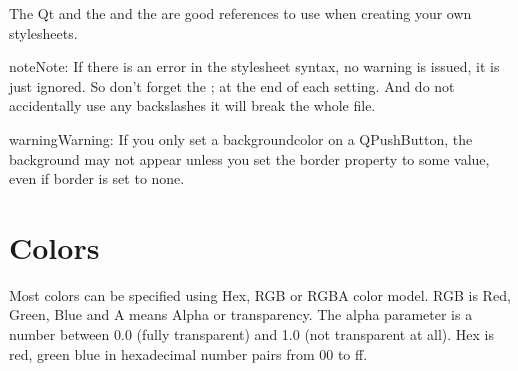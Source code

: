 \documentclass[letterpaper,10pt,english]{sphinxmanual}
\begin{document}
\sphinxAtStartPar
The Qt 
and the 
and the 
are good references to use when creating your own stylesheets.

\begin{sphinxadmonition}{note}{Note:}
\sphinxAtStartPar
If there is an error in the stylesheet syntax, no warning is issued,
it is just ignored. So don’t forget the ; at the end of each setting. And do
not accidentally use any backslashes it will break the whole file.
\end{sphinxadmonition}

\begin{sphinxadmonition}{warning}{Warning:}
\sphinxAtStartPar
If you only set a background\sphinxhyphen{}color on a QPushButton, the background
may not appear unless you set the border property to some value, even if
border is set to none.
\end{sphinxadmonition}


\section{Colors}
\label{\detokenize{style:colors}}
\sphinxAtStartPar
Most colors can be specified using Hex, RGB or RGBA color model. RGB is
Red, Green, Blue and A means Alpha or transparency. The alpha parameter is a
number between 0.0 (fully transparent) and 1.0 (not transparent at all). Hex is
red, green blue in hexadecimal number pairs from 00 to ff.

\begin{sphinxVerbatim}[commandchars=\\\{\}]
\end{sphinxVerbatim}
\end{document}
